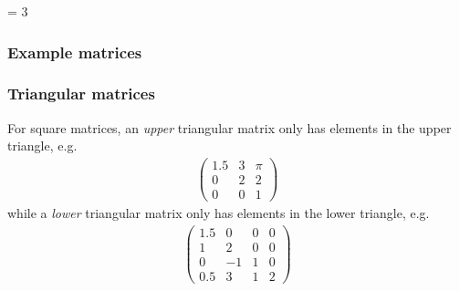 \documentclass[usenames,dvipsnames,aspectratio=169,10pt]{beamer}
\def \EXAMPLEVERSION {3} %
\numberwithin{equation}{section}
\begin{document}
\ifnum \EXAMPLEVERSION = 3
\begin{frame}
\frametitle{Example matrices}
\end{frame}
\fi





\begin{frame}
\frametitle{Triangular matrices}

For square matrices, an \textit{upper} triangular matrix only has elements in the upper triangle, e.g.
\begin{align*}
\begin{pmatrix}
1.5 & 3 & \pi \\
0 & 2 & 2 \\
0 & 0 & 1
\end{pmatrix}
\end{align*}
while a \textit{lower} triangular matrix only has elements in the lower triangle, e.g.
\begin{align*}
\begin{pmatrix}
1.5 & 0  & 0 & 0 \\
1   & 2  & 0 & 0 \\
0   & -1 & 1 & 0 \\
0.5 & 3  & 1 & 2
\end{pmatrix}
\end{align*}

\end{frame}
\end{document}

